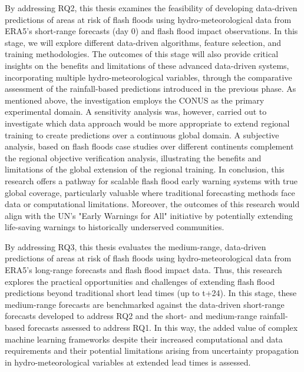 By addressing RQ2, this thesis examines the feasibility of developing data-driven predictions of areas at risk of flash floods using hydro-meteorological data from ERA5's short-range forecasts (day 0) and flash flood impact observations. In this stage, we will explore different data-driven algorithms, feature selection, and training methodologies. The outcomes of this stage will also provide critical insights on the benefits and limitations of these advanced data-driven systems, incorporating multiple hydro-meteorological variables, through the comparative assessment of the rainfall-based predictions introduced in the previous phase. As mentioned above, the investigation employs the CONUS as the primary experimental domain. A sensitivity analysis was, however, carried out to investigate which data approach would be more appropriate to extend regional training to create predictions over a continuous global domain. A subjective analysis, based on flash floods case studies over different continents complement the regional objective verification analysis, illustrating the benefits and limitations of the global extension of the regional training. In conclusion, this research offers a pathway for scalable flash flood early warning systems with true global coverage, particularly valuable where traditional forecasting methods face data or computational limitations. Moreover, the outcomes of this research would align with the UN's "Early Warnings for All" initiative by potentially extending life-saving warnings to historically underserved communities.

By addressing RQ3, this thesis evaluates the medium-range, data-driven predictions of areas at risk of flash floods using hydro-meteorological data from ERA5's long-range forecasts and flash flood impact data. Thus, this research explores the practical opportunities and challenges of extending flash flood predictions beyond traditional short lead times (up to t+24). In this stage, these medium-range forecasts are benchmarked against the data-driven short-range forecasts developed to address RQ2 and the short- and medium-range rainfall-based forecasts assessed to address RQ1. In this way, the added value of complex machine learning frameworks despite their increased computational and data requirements and their potential limitations arising from uncertainty propagation in hydro-meteorological variables at extended lead times is assessed.



